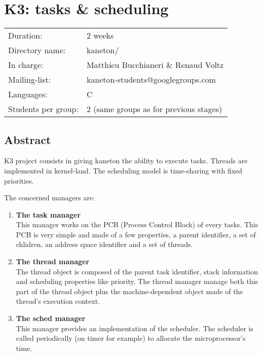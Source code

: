 
%
%

\chapter{K3: tasks \& scheduling}

%
%

\begin{tabular}{p{7cm}l}
Duration: & 2 weeks \\
Directory name: & kaneton/ \\
In charge: & Matthieu Bucchianeri \& Renaud Voltz\\
Mailing-list: & kaneton-students@googlegroups.com \\
Languages: & C \\
Students per group: & 2 (same groups as for previous stages) \\
\end{tabular}

\section{Abstract}

K3 project consists in giving kaneton the ability to execute
tasks. Threads are implemented in kernel-land. The scheduling model is
time-sharing with fixed priorities.

The concerned managers are:

\begin{enumerate}
  \item
    {\bf The task manager}\\
    This manager works on the PCB (Process Control Block) of every
    tasks. This PCB is very simple and made of a few properties, a
    parent identifier, a set of chlidren, an address space identifier
    and a set of threads.
  \item
    {\bf The thread manager}\\
    The thread object is composed of the parent task identifier, stack
    information and scheduling properties like priority. The thread
    manager manage both this part of the thread object plus the
    machine-dependent object made of the thread's execution context.
  \item
    {\bf The sched manager}\\ This manager provides an implementation
    of the scheduler. The scheduler is called periodically (on timer
    for example) to allocate the microprocessor's time.
\end{enumerate}


